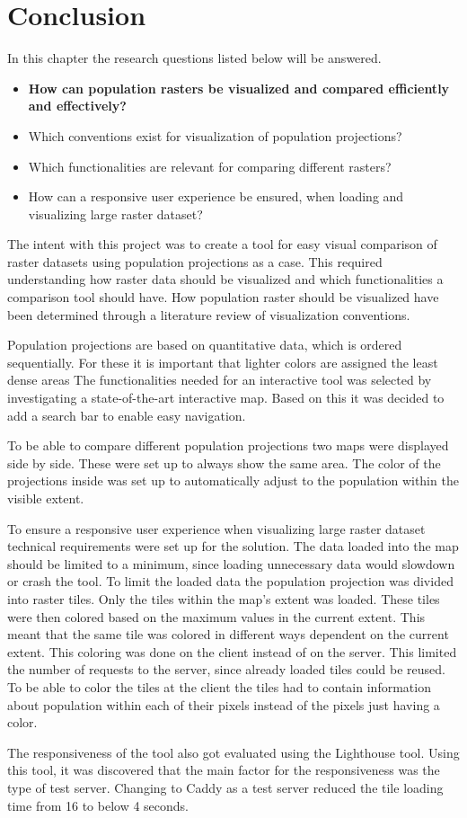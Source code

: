 \chapter{Conclusion}\label{CConclusion}
In this chapter the research questions listed below will be answered.

\begin{itemize}
	\item \textbf{How can population rasters be visualized and compared efficiently and effectively?}
	\item Which conventions exist for visualization of population projections?
	\item Which functionalities are relevant for comparing different rasters?
	\item How can a responsive user experience be ensured, when loading and visualizing large raster dataset?
\end{itemize}


The intent with this project was to create a tool for easy visual comparison of raster datasets using population projections as a case. This required understanding how raster data should be visualized and which functionalities a comparison tool should have. How population raster should be visualized have been determined through a literature review of visualization conventions. 	

Population projections are based on quantitative data, which is ordered sequentially. 
For these it is important that lighter colors are assigned the least dense areas
The functionalities needed for an interactive tool was selected by investigating a state-of-the-art interactive map. Based on this it was decided to add a search bar to enable easy navigation. 

To be able to compare different population projections two maps were displayed side by side. These were set up to always show the same area. The color of the projections inside was set up to automatically adjust to the population within the visible extent.


To ensure a responsive user experience when visualizing large raster dataset technical requirements were set up for the solution. %
The data loaded into the map should be limited to a minimum, since loading unnecessary data would slowdown or crash the tool. To limit the loaded data the population projection was divided into raster tiles. Only the tiles within the map’s extent was loaded. These tiles were then colored based on the maximum values in the current extent. This meant that the same tile was colored in different ways dependent on the current extent. This coloring was done on the client instead of on the server.  This limited the number of requests to the server, since already loaded tiles could be reused. To be able to color the tiles at the client the tiles had to contain information about population within each of their pixels instead of the pixels just having a color.

The responsiveness of the tool also got evaluated using the Lighthouse tool. Using this tool, it was discovered that the main factor for the responsiveness was the type of test server. Changing to Caddy as a test server reduced the tile loading time from 16 to below 4 seconds.

